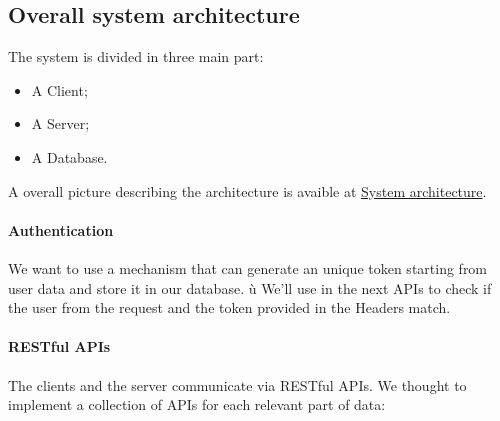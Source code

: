 \documentclass[../../main]{subfiles}
\begin{document}
\subsection{Overall system architecture}
The system is divided in three main part:
    \begin{itemize}
        \item A Client;
        \item A Server;
        \item A Database.
    \end{itemize}

A overall picture describing the architecture is avaible at \hyperref[fig:system_architecture]{System architecture}.

\paragraph*{Authentication}
We want to use a mechanism that can generate an unique token starting from user data and store it in our database. ù
We'll use in the next APIs to check if the user from the request and the token provided in the Headers match.

\paragraph*{RESTful APIs}
The clients and the server communicate via RESTful APIs. We thought to implement a collection of APIs for each relevant part of data:
\end{document}
